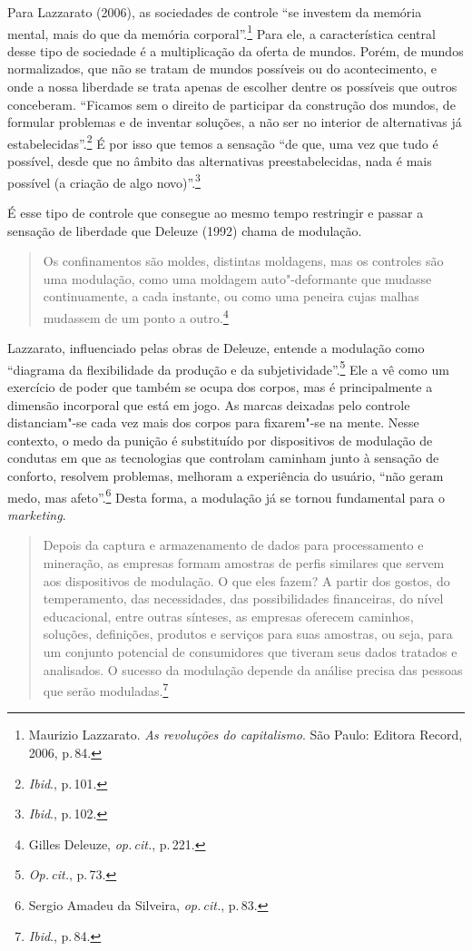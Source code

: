 Para Lazzarato (2006), as sociedades de controle ``se investem da memória mental, mais do que
da memória corporal''.\footnote{Maurizio Lazzarato. \textit{As revoluções do capitalismo}. São Paulo: Editora
Record, 2006, p.\,84.} Para ele, a característica central desse
tipo de sociedade é a multiplicação da oferta de mundos. Porém, de
mundos normalizados, que não se tratam de mundos possíveis ou do
acontecimento, e onde a nossa liberdade se trata apenas de escolher
dentre os possíveis que outros conceberam. ``Ficamos sem o direito de
participar da construção dos mundos, de formular problemas e de inventar
soluções, a não ser no interior de alternativas já estabelecidas''.\footnote{\textit{Ibid}., p.\,101.}
É por isso que temos a sensação ``de que, uma vez que tudo é possível, desde que no âmbito das alternativas preestabelecidas, nada é mais
possível (a criação de algo novo)''.\footnote{\textit{Ibid}., p.\,102.}

É esse tipo de controle que consegue ao mesmo tempo restringir e passar
a sensação de liberdade que Deleuze (1992) chama de modulação.

\begin{quote}
Os confinamentos são moldes, distintas moldagens, mas os controles são
uma modulação, como uma moldagem auto"-deformante que mudasse
continuamente, a cada instante, ou como uma peneira cujas malhas
mudassem de um ponto a outro.\footnote{Gilles Deleuze, \textit{op.\,cit.}, p.\,221.}
\end{quote}

Lazzarato, influenciado pelas obras de Deleuze, entende a
modulação como ``diagrama da flexibilidade da produção e da
subjetividade''.\footnote{\textit{Op.\,cit.}, p.\,73.} Ele a vê como um exercício de poder que também se
ocupa dos corpos, mas é principalmente a dimensão incorporal que está em
jogo. As marcas deixadas pelo controle distanciam"-se cada vez mais dos
corpos para fixarem"-se na mente. Nesse contexto, o medo da punição é
substituído por dispositivos de modulação de condutas em que as
tecnologias que controlam caminham junto à sensação de conforto,
resolvem problemas, melhoram a experiência do usuário, ``não geram medo,
mas afeto''.\footnote{Sergio Amadeu da Silveira, \textit{op.\,cit.}, p.\,83.} Desta forma, a modulação já se tornou fundamental para o \textit{marketing}.

\begin{quote}
Depois da captura e armazenamento de dados para processamento e
mineração, as empresas formam amostras de perfis similares que servem
aos dispositivos de modulação. O que eles fazem? A partir dos gostos, do
temperamento, das necessidades, das possibilidades financeiras, do nível
educacional, entre outras sínteses, as empresas oferecem caminhos,
soluções, definições, produtos e serviços para suas amostras, ou seja,
para um conjunto potencial de consumidores que tiveram seus dados
tratados e analisados. O sucesso da modulação depende da análise precisa
das pessoas que serão moduladas.\footnote{\textit{Ibid}., p.\,84.}
\end{quote}

